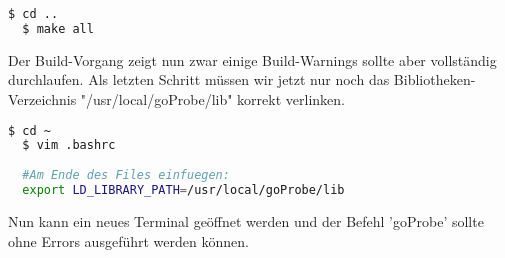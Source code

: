 \begin{lstlisting}[language=bash]
  $ cd ..
  $ make all
\end{lstlisting}

Der Build-Vorgang zeigt nun zwar einige Build-Warnings sollte aber vollständig durchlaufen. Als letzten Schritt müssen wir jetzt nur noch das Bibliotheken-Verzeichnis "/usr/local/goProbe/lib" korrekt verlinken.

\begin{lstlisting}[language=bash]
  $ cd ~
  $ vim .bashrc
  
  #Am Ende des Files einfuegen:
  export LD_LIBRARY_PATH=/usr/local/goProbe/lib
\end{lstlisting}

Nun kann ein neues Terminal geöffnet werden und der Befehl 'goProbe' sollte ohne Errors ausgeführt werden können.